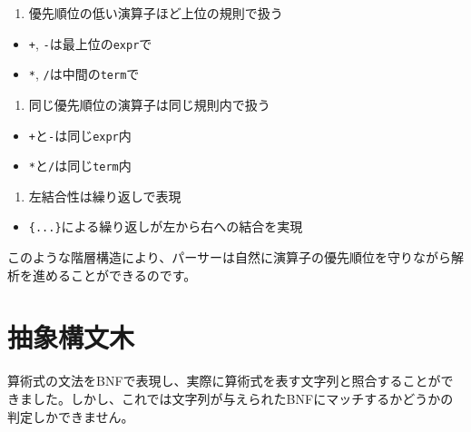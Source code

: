 \begin{enumerate}
\def\labelenumi{\arabic{enumi}.}
\tightlist
\item
  優先順位の低い演算子ほど上位の規則で扱う
\end{enumerate}

\begin{itemize}
\tightlist
\item
  \texttt{+}, \texttt{-}は最上位の\texttt{expr}で
\item
  \texttt{*}, \texttt{/}は中間の\texttt{term}で
\end{itemize}

\begin{enumerate}
\def\labelenumi{\arabic{enumi}.}
\setcounter{enumi}{1}
\tightlist
\item
  同じ優先順位の演算子は同じ規則内で扱う
\end{enumerate}

\begin{itemize}
\tightlist
\item
  \texttt{+}と\texttt{-}は同じ\texttt{expr}内
\item
  \texttt{*}と\texttt{/}は同じ\texttt{term}内
\end{itemize}

\begin{enumerate}
\def\labelenumi{\arabic{enumi}.}
\setcounter{enumi}{2}
\tightlist
\item
  左結合性は繰り返しで表現
\end{enumerate}

\begin{itemize}
\tightlist
\item
  \texttt{\{...\}}による繰り返しが左から右への結合を実現
\end{itemize}

このような階層構造により、パーサーは自然に演算子の優先順位を守りながら解析を進めることができるのです。

\hypertarget{chapter2-ux62bdux8c61ux69cbux6587ux6728}{%
\section{抽象構文木}\label{chapter2-ux62bdux8c61ux69cbux6587ux6728}}

算術式の文法をBNFで表現し、実際に算術式を表す文字列と照合することができました。しかし、これでは文字列が与えられたBNFにマッチするかどうかの判定しかできません。

